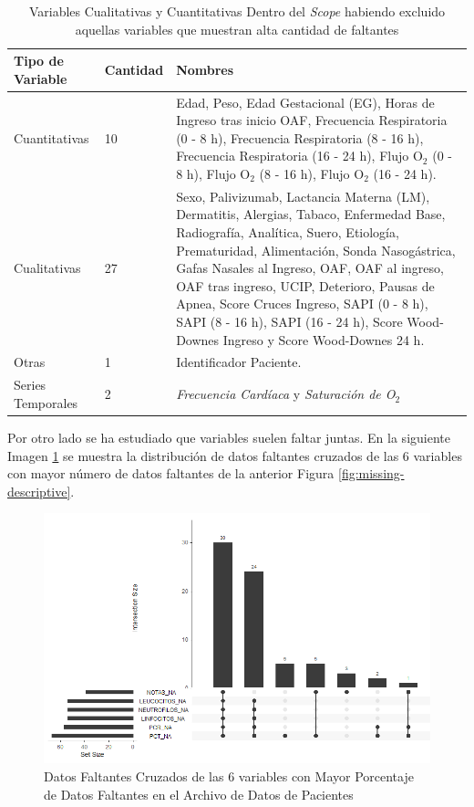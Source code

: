 \begin{table}[H]
    \centering
        \begin{tabular}{| m{5cm} | m{1.75cm} | m{7cm} |}
            \hline Tipo de Variable & Cantidad & Nombres  \\ \hline
            Cuantitativas & 10 & Edad, Peso, Edad Gestacional (EG), Horas de Ingreso tras inicio OAF, Frecuencia Respiratoria (0 - 8 h), Frecuencia Respiratoria (8 - 16 h),
            Frecuencia Respiratoria (16 - 24 h),
            Flujo O$_2$ (0 - 8 h),
            Flujo O$_2$ (8 - 16 h),
            Flujo O$_2$ (16 - 24 h). \\ \hline
            Cualitativas & 27 & Sexo, Palivizumab, Lactancia Materna (LM), Dermatitis, Alergias, Tabaco, Enfermedad Base, Radiografía, Analítica, Suero, Etiología, Prematuridad, Alimentación, Sonda Nasogástrica, Gafas Nasales al Ingreso, OAF, OAF al ingreso, OAF tras ingreso, UCIP, Deterioro, Pausas de Apnea, Score Cruces Ingreso, SAPI (0 - 8 h),
            SAPI (8 - 16 h), 
            SAPI (16 - 24 h), Score Wood-Downes Ingreso y Score Wood-Downes 24 h. \\ \hline
            Otras & 1 & Identificador Paciente. \\ \hline
            Series Temporales & 2 & \textit{Frecuencia Cardíaca} y \textit{Saturación de O$_2$} \\ 
            \hline
        \end{tabular}
    \caption{Variables Cualitativas y Cuantitativas Dentro del \textit{Scope} habiendo excluido aquellas variables que muestran alta cantidad de faltantes}\label{tabla:variables_estudio_final}
\end{table}

Por otro lado se ha estudiado que variables suelen faltar juntas. En la siguiente Imagen \ref{fig:missing-descriptive-cross} se muestra la distribución de datos faltantes cruzados de las 6 variables con mayor número de datos faltantes de la anterior Figura \ref{fig:missing-descriptive}.

\begin{figure}[H]
    \centering
    \includegraphics[scale = 0.70]{./img/missig-data-descriptive-cross.png}
    \caption{Datos Faltantes Cruzados de las 6 variables con Mayor Porcentaje de Datos Faltantes en el Archivo de Datos de Pacientes}
    \label{fig:missing-descriptive-cross}
\end{figure}


